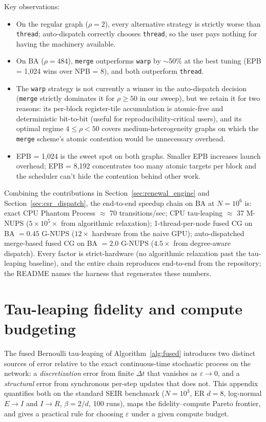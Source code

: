 \documentclass[a4paper,fleqn]{cas-sc}
\theoremstyle{definition}
\theoremstyle{remark}
\begin{document}
Key observations:
\begin{itemize}
\item On the regular graph ($\rho = 2$), every alternative strategy is strictly worse than \texttt{thread}; auto-dispatch correctly chooses \texttt{thread}, so the user pays nothing for having the machinery available.
\item On BA ($\rho = 484$), \texttt{merge} outperforms \texttt{warp} by $\sim$50\% at the best tuning (EPB = 1{,}024 wins over NPB = 8), and both outperform \texttt{thread}.
\item The \texttt{warp} strategy is not currently a winner in the auto-dispatch decision (\texttt{merge} strictly dominates it for $\rho \geq 50$ in our sweep), but we retain it for two reasons: its per-block register-tile accumulation is atomic-free and deterministic bit-to-bit (useful for reproducibility-critical users), and its optimal regime $4 \leq \rho < 50$ covers medium-heterogeneity graphs on which the \texttt{merge} scheme's atomic contention would be unnecessary overhead.
\item EPB = 1{,}024 is the sweet spot on both graphs. Smaller EPB increases launch overhead; EPB = 8{,}192 concentrates too many atomic targets per block and the scheduler can't hide the contention behind other work.
\end{itemize}

Combining the contributions in Section~\ref{sec:renewal_engine} and Section~\ref{sec:csr_dispatch}, the end-to-end speedup chain on BA at $N = 10^6$ is: exact CPU Phantom Process \citep{vajdi2020stochastic} $\approx$ 70 transitions/sec; CPU tau-leaping $\approx$ 37 M-NUPS ($5 \times 10^5\times$ from algorithmic relaxation); 1-thread-per-node fused CG on BA $= 0.45$ G-NUPS ($12\times$ hardware from the naive GPU); auto-dispatched merge-based fused CG on BA $= 2.0$ G-NUPS ($4.5\times$ from degree-aware dispatch). Every factor is strict-hardware (no algorithmic relaxation past the tau-leaping baseline), and the entire chain reproduces end-to-end from the repository; the README names the harness that regenerates these numbers.

\section{Tau-leaping fidelity and compute budgeting}
\label{app:fidelity}

The fused Bernoulli tau-leaping of Algorithm~\ref{alg:fused} introduces two distinct sources of error relative to the exact continuous-time stochastic process on the network: a \emph{discretization} error from finite $\Delta t$ that vanishes as $\varepsilon \to 0$, and a \emph{structural} error from synchronous per-step updates that does not. This appendix quantifies both on the standard SEIR benchmark ($N = 10^3$, ER $d = 8$, log-normal $E\to I$ and $I\to R$, $\beta = 2/d$, 100 runs), maps the fidelity--compute Pareto frontier, and gives a practical rule for choosing $\varepsilon$ under a given compute budget.
\end{document}

